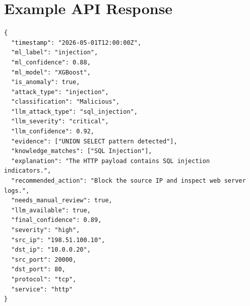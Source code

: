 \documentclass[12pt,a4paper]{report}
\begin{document}
\chapter{Example API Response}

\begin{lstlisting}[style=jsonstyle, caption={Example completed analysis result}]
{
  "timestamp": "2026-05-01T12:00:00Z",
  "ml_label": "injection",
  "ml_confidence": 0.88,
  "ml_model": "XGBoost",
  "is_anomaly": true,
  "attack_type": "injection",
  "classification": "Malicious",
  "llm_attack_type": "sql_injection",
  "llm_severity": "critical",
  "llm_confidence": 0.92,
  "evidence": ["UNION SELECT pattern detected"],
  "knowledge_matches": ["SQL Injection"],
  "explanation": "The HTTP payload contains SQL injection indicators.",
  "recommended_action": "Block the source IP and inspect web server logs.",
  "needs_manual_review": true,
  "llm_available": true,
  "final_confidence": 0.89,
  "severity": "high",
  "src_ip": "198.51.100.10",
  "dst_ip": "10.0.0.20",
  "src_port": 20000,
  "dst_port": 80,
  "protocol": "tcp",
  "service": "http"
}
\end{lstlisting}
\end{document}
